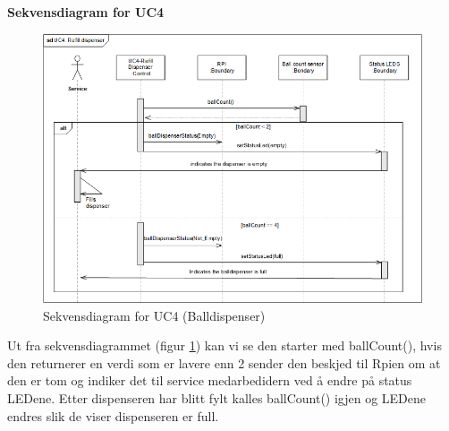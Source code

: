 \documentclass[Rapport/Rapport_main.tex]{subfiles}
\begin{document}
\textbf{Sekvensdiagram for UC4}\\
\begin{figure}[H]
    \centering
    \includegraphics[width=\textwidth]{Arkitektur/Softwarearkitektur/Applikationsmodel/BallDispenser/graphicsBallDispenser/sdUC4.png}
    \caption{Sekvensdiagram for UC4 (Balldispenser)}
    \label{fig:BallDispScUC4}
\end{figure}

Ut fra sekvensdiagrammet (figur \ref{fig:BallDispScUC4}) kan vi se den starter med ballCount(), hvis den returnerer en verdi som er lavere enn 2 sender den beskjed til Rpien om at den er tom og indiker det til service medarbedidern ved å endre på status LEDene. Etter dispenseren har blitt fylt kalles ballCount() igjen og LEDene endres slik de viser dispenseren er full.
\end{document}
